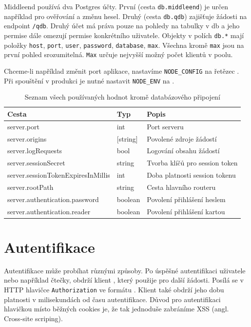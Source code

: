 Middleend používá dva Postgres účty. První (cesta \verb|db.middleend|) je určen například pro
ověřování a změnu hesel. Druhý (cesta \verb|db.qdb|) zajišťuje žádosti na endpoint \verb|/qdb|.
Druhý účet má práva pouze na pohledy na tabulky v db a jeho
permise dále omezují permise konkrétního uživatele. Objekty v polích \verb|db.*| mají
položky \verb|host|, \verb|port|, \verb|user|, \verb|password|, \verb|database|, \verb|max|.
Všechna kromě \verb|max| jsou na první pohled srozumitelná. \verb|Max| určuje nejvyšší možný počet klientů v poolu.

Chceme-li například změnit port aplikace, nastavíme \verb|NODE_CONFIG|
na řetězec . Při spouštění v produkci je 
nutné nastavit \verb|NODE_ENV| na \newline {}.

\begin{table} \centering
\begin{tabular}{ l l l }
    {\textbf{Cesta}} & {\textbf{Typ}} & {\textbf{Popis}} \\
    \hline
    server.port & int & Port serveru \\
    server.origins & [string] & Povolené zdroje žádostí \\
    server.logRequests & bool & Logování obsahu žádostí \\
    server.sessionSecret & string & Tvorba klíčů pro session token \\
    server.sessionTokenExpiresInMillis & int & Doba platnosti session tokenu \\
    server.rootPath & string & Cesta hlavního routeru \\
    \hline
    server.authentication.password & boolean & Povolení přihlášení heslem \\
    server.authentication.reader & boolean & Povolení přihlášení kartou \\
\end{tabular}
\caption{Seznam všech používaných hodnot kromě databázového připojení}
\label{tb03:configKeys}
\end{table}

\section{Autentifikace}

Autentifikace může probíhat různými způsoby. Po úspěšné autentifikaci
uživatele nebo například čtečky, obdrží klient , který
použije pro další žádosti. Posílá se v HTTP hlavičce \verb|Authorization|
ve formátu . Klient také obdrží jeho dobu platnosti
v milisekundách od času autentifikace. Důvod pro autentifikaci hlavičkou
místo běžných cookies je, že tak jednoduše zabráníme XSS (angl. Cross-site scriping).

